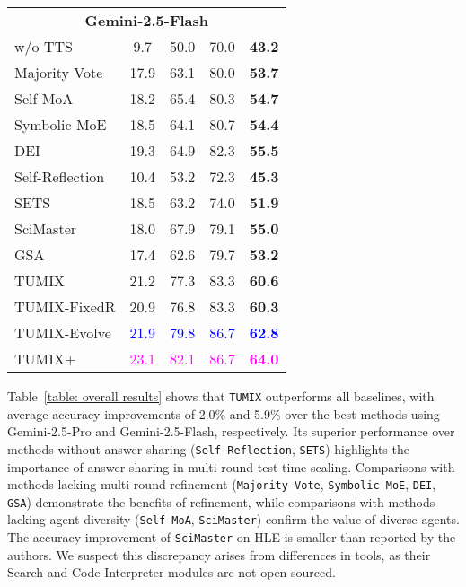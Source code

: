 \begin{table*}[ht]
\begin{small}
\begin{sc}
\begin{tabular}{lcccc}
\midrule
\multicolumn{5}{c}{\textbf{Gemini-2.5-Flash}}\\
w/o TTS & 9.7 & 50.0 & 70.0 & \textbf{43.2} \\
Majority Vote & 17.9 & 63.1 & 80.0 & \textbf{53.7} \\
Self-MoA & 18.2 & 65.4 & 80.3 & \textbf{54.7} \\
Symbolic-MoE & 18.5 & 64.1 & 80.7 & \textbf{54.4} \\
DEI & 19.3 & 64.9 & 82.3 & \textbf{55.5} \\
Self-Reflection & 10.4 & 53.2 & 72.3 & \textbf{45.3} \\
SETS & 18.5 & 63.2 & 74.0 & \textbf{51.9} \\
SciMaster & 18.0 & 67.9 & 79.1 & \textbf{55.0} \\
GSA & 17.4 & 62.6 & 79.7 & \textbf{53.2} \\
\rowcolor{LightCyan} TUMIX & 21.2 & 77.3 & 83.3 & \textbf{60.6} \\
\rowcolor{LightCyan} TUMIX-FixedR & 20.9 & 76.8 & 83.3 & \textbf{60.3} \\
\rowcolor{LightCyan} TUMIX-Evolve & \textcolor{blue}{21.9} & \textcolor{blue}{79.8} & \textcolor{blue}{86.7} & \textcolor{blue}{\textbf{62.8}} \\
\rowcolor{softlavender} TUMIX+ & \textcolor{magenta}{23.1} & \textcolor{magenta}{82.1} & \textcolor{magenta}{86.7} & \textcolor{magenta}{\textbf{64.0}} \\
\bottomrule
\end{tabular}
\end{sc}
\end{small}
\vskip -0.1in
\vspace{-2mm}
\end{table*}

Table~\ref{table: overall results} shows that \texttt{TUMIX} outperforms all baselines, with average accuracy improvements of 2.0\% and 5.9\% over the best methods using Gemini-2.5-Pro and Gemini-2.5-Flash, respectively. Its superior performance over methods without answer sharing (\texttt{Self-Reflection}, \texttt{SETS}) highlights the importance of answer sharing in multi-round test-time scaling. Comparisons with methods lacking multi-round refinement (\texttt{Majority-Vote}, \texttt{Symbolic-MoE}, \texttt{DEI}, \texttt{GSA}) demonstrate the benefits of refinement, while comparisons with methods lacking agent diversity (\texttt{Self-MoA}, \texttt{SciMaster}) confirm the value of diverse agents. The accuracy improvement of \texttt{SciMaster} on HLE is smaller than reported by the authors. We suspect this discrepancy arises from differences in tools, as their Search and Code Interpreter modules are not open-sourced.